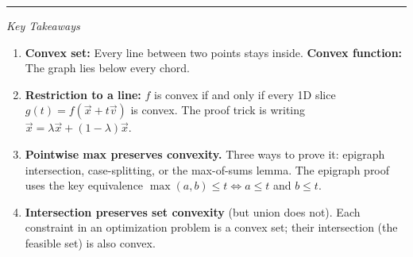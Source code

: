\documentclass[10pt]{article}
\theoremstyle{definition}
\theoremstyle{plain}
\begin{document}
\vfill

\begin{center}
\rule{0.5\linewidth}{0.4pt}

\textit{Key Takeaways}
\end{center}

\begin{enumerate}
    \item \textbf{Convex set:} Every line between two points stays inside. \textbf{Convex function:} The graph lies below every chord.

    \item \textbf{Restriction to a line:} $f$ is convex if and only if every 1D slice $g(t) = f(\vec{x} + t\vec{v})$ is convex. The proof trick is writing $\vec{x} = \lambda\vec{x} + (1-\lambda)\vec{x}$.

    \item \textbf{Pointwise max preserves convexity.} Three ways to prove it: epigraph intersection, case-splitting, or the max-of-sums lemma. The epigraph proof uses the key equivalence $\max(a,b) \le t \iff a \le t$ and $b \le t$.

    \item \textbf{Intersection preserves set convexity} (but union does not). Each constraint in an optimization problem is a convex set; their intersection (the feasible set) is also convex.
\end{enumerate}
\end{document}
